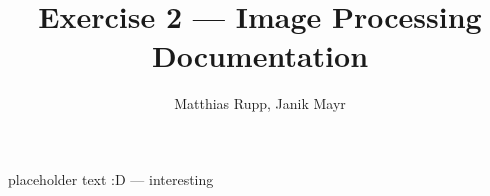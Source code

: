 \documentclass[a4paper, 11pt]{scrreprt}
\title{Exercise 2 — Image Processing Documentation}
\author{Matthias Rupp, Janik Mayr}
\begin{document}
    \maketitle
    placeholder text :D — interesting
\end{document}
